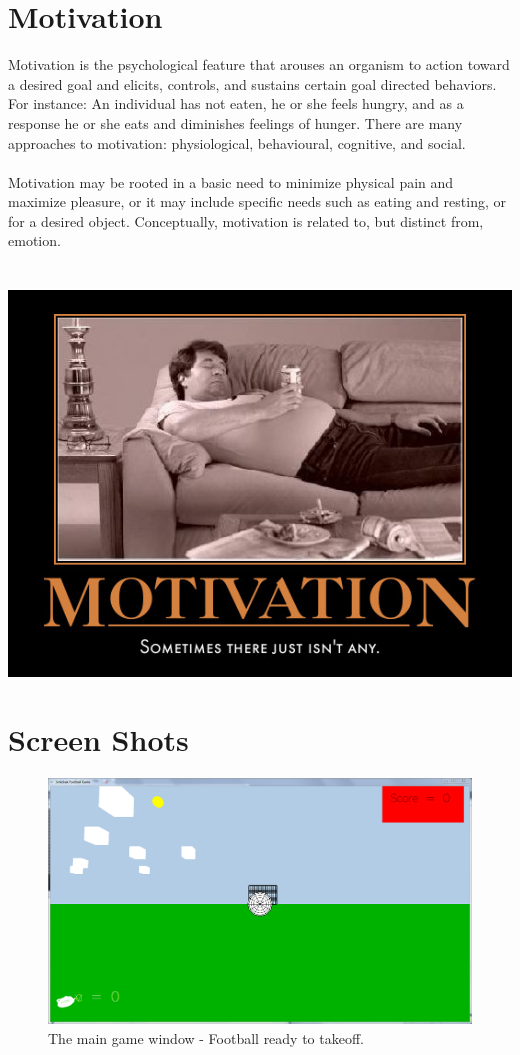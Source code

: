 \documentclass[12pt]{article} %
\begin{document}
\section{Motivation}
	Motivation is the psychological feature that arouses an organism to action toward a desired goal and elicits, controls, and sustains certain goal directed behaviors. For instance: An individual has not eaten, he or she feels hungry, and as a response he or she eats and diminishes feelings of hunger. There are many approaches to motivation: physiological, behavioural, cognitive, and social.\\
\\Motivation may be rooted in a basic need to minimize physical pain and maximize pleasure, or it may include specific needs such as eating and resting, or for a desired object. Conceptually, motivation is related to, but distinct from, emotion.
\\ \\ \\

\includegraphics[scale=0.8]{motivation.jpg}\\
\newpage   
\section{Screen Shots}
\begin{figure}[h!]
  \centering
    \includegraphics[scale=0.35]{init_screen.png}
  \caption{The main game window - Football ready to takeoff.}
\end{figure}
\end{document}
